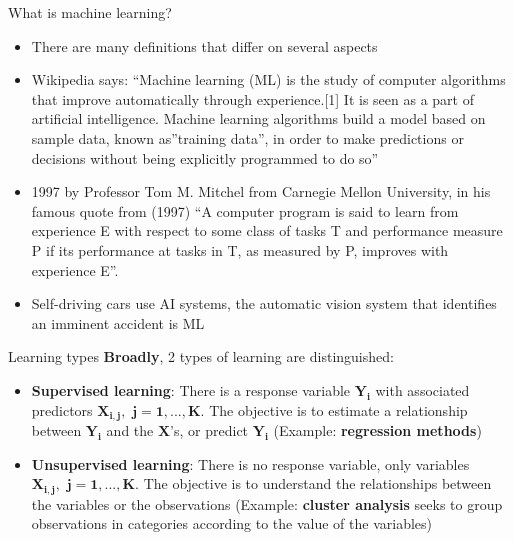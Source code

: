 \documentclass[
  ignorenonframetext,
  aspectratio=169]{beamer}
\providecommand{\tightlist}{%
  \setlength{\itemsep}{0pt}\setlength{\parskip}{0pt}}
\begin{document}
\begin{frame}{What is machine learning?}
\protect\hypertarget{what-is-machine-learning}{}
\label{ML}

\begin{itemize}
\tightlist
\item
  There are many definitions that differ on several aspects
\item
  Wikipedia says: ``Machine learning (ML) is the study of computer
  algorithms that improve automatically through experience.{[}1{]} It is
  seen as a part of artificial intelligence. Machine learning algorithms
  build a model based on sample data, known as''training data'', in
  order to make predictions or decisions without being explicitly
  programmed to do so''
\item
  1997 by Professor Tom M. Mitchel from Carnegie Mellon University, in
  his famous quote from (1997) ``A computer program is said to learn
  from experience E with respect to some class of tasks T and
  performance measure P if its performance at tasks in T, as measured by
  P, improves with experience E''.
\item
  Self-driving cars use AI systems, the automatic vision system that
  identifies an imminent accident is ML
\end{itemize}
\end{frame}

\begin{frame}{Learning types}
\protect\hypertarget{learning-types}{}
\textbf{Broadly}, 2 types of learning are distinguished:

\begin{itemize}
\tightlist
\item
  \textbf{Supervised learning}: There is a response variable
  \(\bm{Y_i}\) with associated predictors
  \(\bm{X_{i,j}, \, \, j=1,...,K}\). The objective is to estimate a
  relationship between \(\bm{Y_i}\) and the \(\bm{X}\)'s, or predict
  \(\bm{Y_i}\) (Example: \textbf{regression methods})
\item
  \textbf{Unsupervised learning}: There is no response variable, only
  variables \(\bm{X_{i,j}, \, \, j=1,...,K}\). The objective is to
  understand the relationships between the variables or the observations
  (Example: \textbf{cluster analysis} seeks to group observations in
  categories according to the value of the variables)
\end{itemize}
\end{frame}
\end{document}
